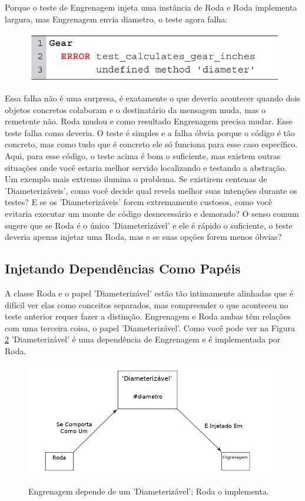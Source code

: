 Porque o teste de Engrenagem injeta uma instância de Roda e Roda implementa
largura, mas Engrenagem envia diametro, o teste agora falha:

\begin{figure}[!htbp]
  \center
  \includegraphics[scale=0.50]{imagens/codigo_pag_208_a.png}
  \label{img:codigo_pag_208_a}
\end{figure}

Essa falha não é uma surpresa, é exatamente o que deveria acontecer quando dois
objetos concretos colaboram e o destinatário da mensagem muda, mas o remetente
não. Roda mudou e como resultado Engrenagem precisa mudar. Esse teste falha como
deveria.
O teste é simples e a falha óbvia porque o código é tão concreto, mas como tudo
que é concreto ele só funciona para esse caso específico. Aqui, para esse
código, o teste acima é bom o suficiente, mas existem outras situações onde você
estaria melhor servido localizando e testando a abstração.
Um exemplo mais extremo ilumina o problema. Se existirem centenas de
'Diameterizáveis', como você decide qual revela melhor suas intenções durante os
testes? E se os 'Diameterizáveis' forem extremamente custosos, como você
evitaria executar um monte de código desnecessário e demorado? O senso comum
sugere que se Roda é o único 'Diameterizável' e ele é rápido o suficiente, o
teste deveria apenas injetar uma Roda, mas e se suas opções forem menos óbvias?

\subsection{Injetando Dependências Como Papéis}

A classe Roda e o papel 'Diameterizável' estão tão intimamente alinhadas que é
difícil ver elas como conceitos separados, mas compreender o que aconteceu no
teste anterior requer fazer a distinção. Engrenagem e Roda ambas têm relações
com uma terceira coisa, o papel 'Diameterizável'. Como você pode ver na Figura
\ref{img:codigo_pag_208_b} 'Diameterizável' é uma dependência de
Engrenagem e é implementada por Roda.

\begin{figure}[!htbp]
  \center
  \caption{Engrenagem depende de um 'Diameterizável'; Roda o implementa.}
  \includegraphics[scale=0.50]{imagens/codigo_pag_208_b.png}
  \label{img:codigo_pag_208_b}
\end{figure}

